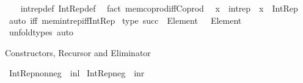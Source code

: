 \begin{isabellebody}
%
\isadelimproof
\ \ %
\endisadelimproof
%
\isatagproof
{}\isamarkupfalse%
\ int{\isacharunderscore}{\kern0pt}rep{\isacharunderscore}{\kern0pt}def\ Int{\isacharunderscore}{\kern0pt}Rep{\isacharunderscore}{\kern0pt}def\ \isamarkupfalse%
\ {\isacharparenleft}{\kern0pt}fact\ mem{\isacharunderscore}{\kern0pt}coprod{\isacharunderscore}{\kern0pt}iff{\isacharunderscore}{\kern0pt}Coprod{\isacharparenright}{\kern0pt}%
\endisatagproof
{\isafoldproof}%
%
\isadelimproof
\isanewline
%
\endisadelimproof
\isanewline
{}\isamarkupfalse%
\isanewline
\ \ {\isachardoublequoteopen}x\ {\isasymin}\ int{\isacharunderscore}{\kern0pt}rep{\isachardoublequoteclose}\ {\isasymrightleftharpoons}\ {\isachardoublequoteopen}x\ {\isacharcolon}{\kern0pt}\ Int{\isacharunderscore}{\kern0pt}Rep{\isachardoublequoteclose}\isanewline
%
\isadelimproof
\ \ %
\endisadelimproof
%
\isatagproof
{}\isamarkupfalse%
\ {\isacharparenleft}{\kern0pt}auto\ iff{\isacharcolon}{\kern0pt}\ mem{\isacharunderscore}{\kern0pt}int{\isacharunderscore}{\kern0pt}rep{\isacharunderscore}{\kern0pt}iff{\isacharunderscore}{\kern0pt}Int{\isacharunderscore}{\kern0pt}Rep{\isacharparenright}{\kern0pt}%
\endisatagproof
{\isafoldproof}%
%
\isadelimproof
\isanewline
%
\endisadelimproof
\isanewline
{}\isamarkupfalse%
\ {\isacharbrackleft}{\kern0pt}type{\isacharbrackright}{\kern0pt}{\isacharcolon}{\kern0pt}\ {\isachardoublequoteopen}succ\ {\isacharcolon}{\kern0pt}\ Element\ {\isasymnat}\ {\isasymRightarrow}\ Element\ {\isacharparenleft}{\kern0pt}{\isasymnat}\ {\isasymsetminus}\ {\isacharbraceleft}{\kern0pt}{}{\isacharbraceright}{\kern0pt}{\isacharparenright}{\kern0pt}{\isachardoublequoteclose}\isanewline
%
\isadelimproof
\ \ %
\endisadelimproof
%
\isatagproof
{}\isamarkupfalse%
\ unfold{\isacharunderscore}{\kern0pt}types\ auto%
\endisatagproof
{\isafoldproof}%
%
\isadelimproof
%
\endisadelimproof
%
\begin{isamarkuptext}%
Constructors, Recursor and Eliminator%
\end{isamarkuptext}\isamarkuptrue%
\isamarkupfalse%
\ {\isachardoublequoteopen}Int{\isacharunderscore}{\kern0pt}Rep{\isacharunderscore}{\kern0pt}nonneg\ {\isasymequiv}\ inl{\isachardoublequoteclose}\isanewline
\isanewline
{}\isamarkupfalse%
\ {\isachardoublequoteopen}Int{\isacharunderscore}{\kern0pt}Rep{\isacharunderscore}{\kern0pt}neg\ {\isasymequiv}\ inr{\isachardoublequoteclose}\isanewline

\end{isabellebody}
